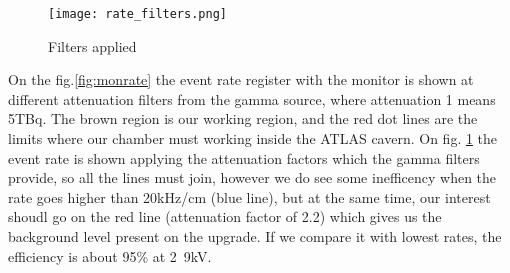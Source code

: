 \begin{figure}[!ht]
	\centering
	\texttt{[image: rate\_filters.png]}
	\caption{Filters applied}\label{fig:filters}
\end{figure}
On the fig.\ref{fig:monrate} the event rate register with the monitor is shown at different attenuation filters from the
gamma source, where attenuation 1 means \unit{5}{TBq}. The
brown region is our working region, and the red dot lines are the limits where our chamber must working inside the ATLAS
cavern. On fig. \ref{fig:filters} the  event rate is shown applying the attenuation factors which the gamma filters
provide, so all the lines must join, however we do see some inefficency when the rate goes higher than \unit{20}{kHz/cm} (blue
line), but at the same time, our interest shoudl go on the red line (attenuation factor of 2.2) which gives us the
background level present on the upgrade. If we compare it with lowest rates, the efficiency is about 95\% at
\unit{2.9}{kV}.



